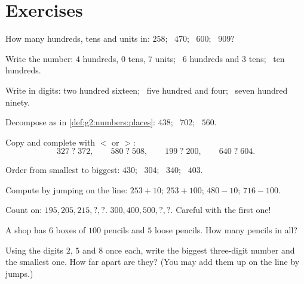 \section{Exercises}

\begin{exercise}[$\star$]\label{exo:g2:numbers:1}
How many hundreds, tens and units in: $258$; \ $470$; \ $600$; \
$909$?
\end{exercise}

\begin{exercise}[$\star$]\label{exo:g2:numbers:2}
Write the number: $4$ hundreds, $0$ tens, $7$ units; \ $6$ hundreds
and $3$ tens; \ ten hundreds.
\end{exercise}

\begin{exercise}[$\star$]\label{exo:g2:numbers:3}
Write in digits: two hundred sixteen; \ five hundred and four; \
seven hundred ninety.
\end{exercise}

\begin{exercise}[$\star$]\label{exo:g2:numbers:4}
Decompose as in \cref{def:g2:numbers:places}: $438$; \ $702$; \
$560$.
\end{exercise}

\begin{exercise}[$\star$]\label{exo:g2:numbers:5}
Copy and complete with $<$ or $>$:
\[
327 \;?\; 372, \qquad
580 \;?\; 508, \qquad
199 \;?\; 200, \qquad
640 \;?\; 604 .
\]
\end{exercise}

\begin{exercise}[$\star$]\label{exo:g2:numbers:6}
Order from smallest to biggest: $430$; \ $304$; \ $340$; \ $403$.
\end{exercise}

\begin{exercise}[$\star$]\label{exo:g2:numbers:7}
Compute by jumping on the line: $253 + 10$; \quad $253 + 100$;
\quad $480 - 10$; \quad $716 - 100$.
\end{exercise}

\begin{exercise}[$\star$]\label{exo:g2:numbers:8}
Count on: $195, 205, 215, ?, ?$. \quad
$300, 400, 500, ?, ?$. \quad Careful with the first one!
\end{exercise}

\begin{exercise}[$\star$]\label{exo:g2:numbers:9}
A shop has $6$ boxes of $100$ pencils and $5$ loose pencils. How
many pencils in all?
\end{exercise}

\begin{exercise}[$\star\star$]\label{exo:g2:numbers:10}
Using the digits $2$, $5$ and $8$ once each, write the biggest
three-digit number and the smallest one. How far apart are they?
(You may add them up on the line by jumps.)
\end{exercise}
